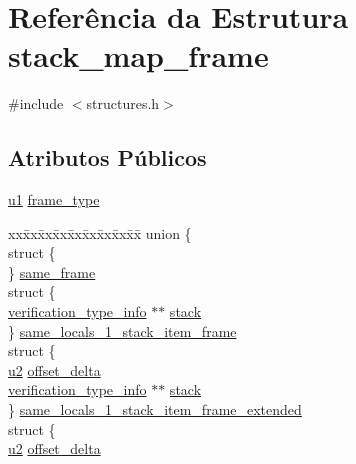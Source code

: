 \hypertarget{structstack__map__frame}{}\section{Referência da Estrutura stack\+\_\+map\+\_\+frame}
\label{structstack__map__frame}


{\ttfamily \#include $<$structures.\+h$>$}

\subsection*{Atributos Públicos}
\begin{DoxyCompactItemize}
\item 
\hyperlink{lista__operandos_8h_ad9f4cdb6757615aae2fad89dab3c5470}{u1} \hyperlink{structstack__map__frame_ae7d53e0f8daea6d5738a88ffb94e575c}{frame\+\_\+type}
\item 
\begin{tabbing}
xx\=xx\=xx\=xx\=xx\=xx\=xx\=xx\=xx\=\kill
union \{\\
\>struct \{\\
\>\} \hyperlink{structstack__map__frame_a761073b8521c7ac269b5357dfcf963b6}{same\_frame}\\
\>struct \{\\
\>\>\hyperlink{structverification__type__info}{verification\_type\_info} $\ast$$\ast$ \hyperlink{structstack__map__frame_acf0d1f6336e72271bc0d91186a9360d5}{stack}\\
\>\} \hyperlink{structstack__map__frame_a5503eba82f65aaa1b91d7bebf48f778a}{same\_locals\_1\_stack\_item\_frame}\\
\>struct \{\\
\>\>\hyperlink{lista__operandos_8h_a732cde1300aafb73b0ea6c2558a7a54f}{u2} \hyperlink{structstack__map__frame_a6eb1565feda91c1edced70dc473c834d}{offset\_delta}\\
\>\>\hyperlink{structverification__type__info}{verification\_type\_info} $\ast$$\ast$ \hyperlink{structstack__map__frame_acf0d1f6336e72271bc0d91186a9360d5}{stack}\\
\>\} \hyperlink{structstack__map__frame_a13c670726708696c2f2b9d12309d7038}{same\_locals\_1\_stack\_item\_frame\_extended}\\
\>struct \{\\
\>\>\hyperlink{lista__operandos_8h_a732cde1300aafb73b0ea6c2558a7a54f}{u2} \hyperlink{structstack__map__frame_a6eb1565feda91c1edced70dc473c834d}{offset\_delta}\\

\end{tabbing}
\end{DoxyCompactItemize}
